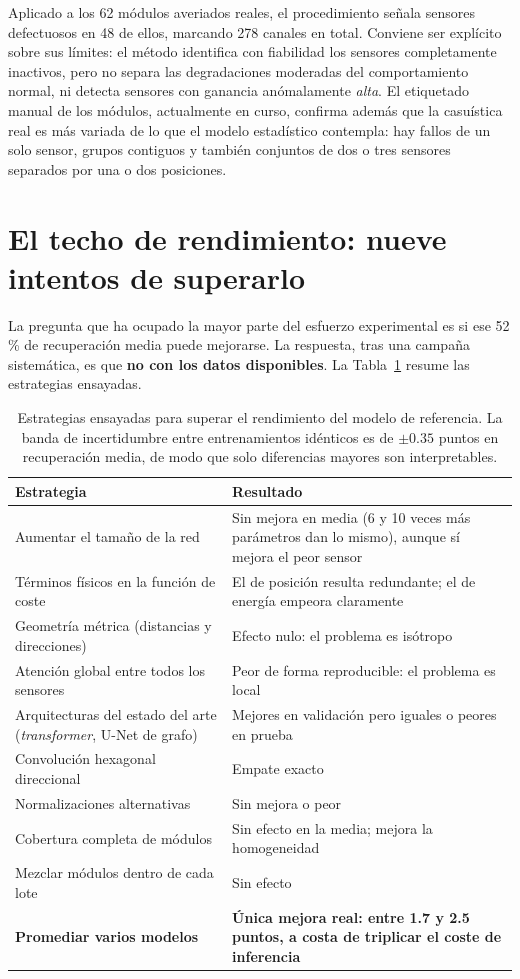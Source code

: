\documentclass[11pt,a4paper]{article}
\begin{document}
Aplicado a los 62 módulos averiados reales, el procedimiento señala sensores defectuosos en
48 de ellos, marcando 278 canales en total. Conviene ser explícito sobre sus límites: el
método identifica con fiabilidad los sensores completamente inactivos, pero no separa las
degradaciones moderadas del comportamiento normal, ni detecta sensores con ganancia
anómalamente \emph{alta}. El etiquetado manual de los módulos, actualmente en curso,
confirma además que la casuística real es más variada de lo que el modelo estadístico
contempla: hay fallos de un solo sensor, grupos contiguos y también conjuntos de dos o tres
sensores separados por una o dos posiciones.

\section{El techo de rendimiento: nueve intentos de superarlo}

La pregunta que ha ocupado la mayor parte del esfuerzo experimental es si ese 52\,\% de
recuperación media puede mejorarse. La respuesta, tras una campaña sistemática, es que
\textbf{no con los datos disponibles}. La Tabla~\ref{tab:techo} resume las estrategias
ensayadas.

\begin{table}[H]
\centering
\caption{Estrategias ensayadas para superar el rendimiento del modelo de referencia. La
banda de incertidumbre entre entrenamientos idénticos es de $\pm 0.35$ puntos en
recuperación media, de modo que solo diferencias mayores son interpretables.}
\label{tab:techo}
\small
\begin{tabular}{lp{8.4cm}}
\toprule
\textbf{Estrategia} & \textbf{Resultado} \\
\midrule
Aumentar el tamaño de la red & Sin mejora en media (6 y 10 veces más parámetros dan lo
mismo), aunque sí mejora el peor sensor \\
Términos físicos en la función de coste & El de posición resulta redundante; el de energía
empeora claramente \\
Geometría métrica (distancias y direcciones) & Efecto nulo: el problema es isótropo \\
Atención global entre todos los sensores & Peor de forma reproducible: el problema es local \\
Arquitecturas del estado del arte (\emph{transformer}, U-Net de grafo) & Mejores en
validación pero iguales o peores en prueba \\
Convolución hexagonal direccional & Empate exacto \\
Normalizaciones alternativas & Sin mejora o peor \\
Cobertura completa de módulos & Sin efecto en la media; mejora la homogeneidad \\
Mezclar módulos dentro de cada lote & Sin efecto \\
\midrule
\textbf{Promediar varios modelos} & \textbf{Única mejora real: entre 1.7 y 2.5 puntos,
a costa de triplicar el coste de inferencia} \\
\bottomrule
\end{tabular}
\end{table}
\end{document}

